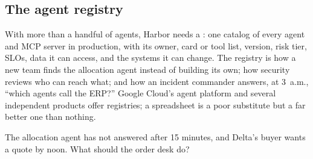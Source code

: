 \subsection{The agent registry}

With more than a handful of agents, Harbor needs a : one catalog of every agent and MCP server in production, with its owner, card or tool list, version, risk tier, SLOs, data it can access, and the systems it can change. The registry is how a new team finds the allocation agent instead of building its own; how security reviews who can reach what; and how an incident commander answers, at 3~a.m., ``which agents call the ERP?'' Google Cloud's agent platform and several independent products offer registries; a spreadsheet is a poor substitute but a far better one than nothing.

\begin{quickcheck}
The allocation agent has not answered after 15 minutes, and Delta's buyer wants a quote by noon. What should the order desk do?
\end{quickcheck}
